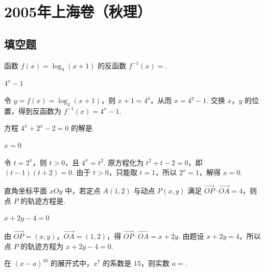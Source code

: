 \chapter{2005年上海卷（秋理）}
\section{填空题}
\begin{problem}
函数 \( f(x)=\log_{4}(x+1) \) 的反函数 \( f^{-1}(x)= \)\fillinblank{}.
\end{problem}

\begin{answer}
\(4^x-1\)
\end{answer}

\begin{solution}
令 \(y=f(x)=\log_{4}(x+1)\)，则 \(x+1=4^y\)，从而 \(x=4^y-1\). 交换 \(x\)，\(y\) 的位置，得到反函数为 \(f^{-1}(x)=4^x-1\).
\end{solution}

\begin{problem}
方程 \( 4^{x} + 2^{x} - 2 = 0 \) 的解是\fillinblank{}.
\end{problem}

\begin{answer}
\(x=0\)
\end{answer}

\begin{solution}
令 \(t=2^x\)，则 \(t>0\)，且 \(4^x=t^2\). 原方程化为 \(t^2+t-2=0\)，即 \((t-1)(t+2)=0\). 由于 \(t>0\)，只能取 \(t=1\)，所以 \(2^x=1\)，解得 \(x=0\).
\end{solution}

\begin{problem}
直角坐标平面 \(xOy\) 中，若定点 \(A(1,2)\) 与动点 \(P(x,y)\) 满足 \(\overrightarrow{OP} \cdot \overrightarrow{OA} = 4\)，则点 \(P\) 的轨迹方程是\fillinblank{}.
\end{problem}

\begin{answer}
\(x+2y-4=0\)
\end{answer}

\begin{solution}
由 \(\overrightarrow{OP}=(x,y)\)，\(\overrightarrow{OA}=(1,2)\)，得 \(\overrightarrow{OP}\cdot\overrightarrow{OA}=x+2y\). 由题设 \(x+2y=4\)，所以点 \(P\) 的轨迹方程为 \(x+2y-4=0\).
\end{solution}

\begin{problem}
在 \((x - a)^10\) 的展开式中，\(x^7\) 的系数是 \(15\)，则实数 \(a = \)\fillinblank{}.
\end{problem}

